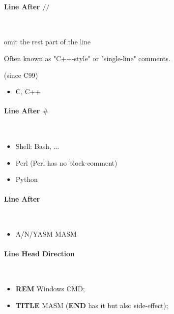 

\paragraph{Line After $//$} \



omit the rest part of the line

Often known as "C++-style" or "single-line" comments.

(since C99)

\begin{itemize}

\item C, C++
\end{itemize}



\paragraph{Line After $\#$} \

\begin{itemize}

\item Shell: Bash, ...
\item Perl (Perl has no block-comment)
\item Python
\end{itemize}



\paragraph{Line After $\;$} \

\begin{itemize}

\item A/N/YASM MASM
\end{itemize}



\paragraph{Line Head Direction} \

\begin{itemize}

\item \textbf{REM} Windows CMD;
\item \textbf{TITLE} MASM (\textbf{END} has it but also side-effect);
\end{itemize}



